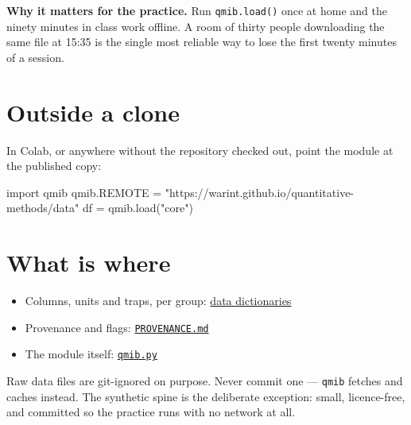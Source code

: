 \documentclass[
  letterpaper,
  10pt,
  twoside,
  openright,
  numbers=noenddot,
  chapterprefix=true]{scrbook}
\newenvironment{Shaded}{}{}
\newcommand{\ImportTok}[1]{\textcolor[rgb]{0.01,0.18,0.38}{#1}}
\newcommand{\NormalTok}[1]{\textcolor[rgb]{0.14,0.16,0.18}{#1}}
\newcommand{\OperatorTok}[1]{\textcolor[rgb]{0.14,0.16,0.18}{#1}}
\newcommand{\StringTok}[1]{\textcolor[rgb]{0.01,0.18,0.38}{#1}}
\providecommand{\tightlist}{%
  \setlength{\itemsep}{0pt}\setlength{\parskip}{0pt}}
\begin{document}
\begin{qmibstep}

\textbf{Why it matters for the practice.} Run \texttt{qmib.load()} once
at home and the ninety minutes in class work offline. A room of thirty
people downloading the same file at 15:35 is the single most reliable
way to lose the first twenty minutes of a session.

\end{qmibstep}

\section{Outside a clone}\label{outside-a-clone}

In Colab, or anywhere without the repository checked out, point the
module at the published copy:

\begin{Shaded}
\begin{Highlighting}[]
\ImportTok{import}\NormalTok{ qmib}
\NormalTok{qmib.REMOTE }\OperatorTok{=} \StringTok{"https://warint.github.io/quantitative{-}methods/data"}
\NormalTok{df }\OperatorTok{=}\NormalTok{ qmib.load(}\StringTok{"core"}\NormalTok{)}
\end{Highlighting}
\end{Shaded}

\section{What is where}\label{what-is-where}

\begin{itemize}
\tightlist
\item
  Columns, units and traps, per group:
  \href{https://github.com/warint/quantitative-methods/blob/main/data/spine/dictionaries/}{data
  dictionaries}
\item
  Provenance and flags:
  \href{https://github.com/warint/quantitative-methods/blob/main/data/spine/PROVENANCE.md}{\texttt{PROVENANCE.md}}
\item
  The module itself:
  \href{https://github.com/warint/quantitative-methods/blob/main/qmib.py}{\texttt{qmib.py}}
\end{itemize}

\begin{qmibwarn}

Raw data files are git-ignored on purpose. Never commit one ---
\texttt{qmib} fetches and caches instead. The synthetic spine is the
deliberate exception: small, licence-free, and committed so the practice
runs with no network at all.

\end{qmibwarn}
\end{document}
